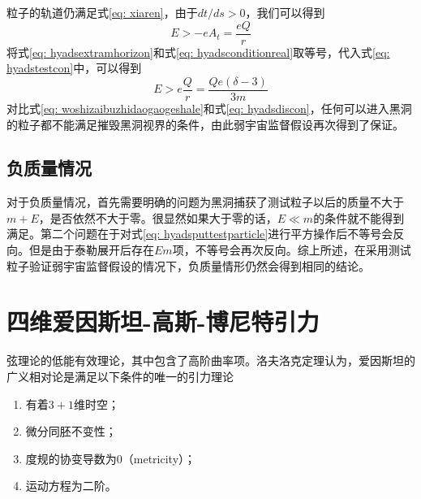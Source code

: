 粒子的轨道仍满足式\eqref{eq: xiaren}，由于$dt/ds>0$，我们可以得到
\begin{equation}\label{eq: hyadstestcon}
    E>-eA_t=\frac{eQ}{r}
\end{equation}
将式\eqref{eq: hyadsextramhorizon}和式\eqref{eq: hyadsconditionreal}取等号，代入式\eqref{eq: hyadstestcon}中，可以得到
\begin{equation}\label{eq: woshizaibuzhidaogaogeshale}
    E > e\frac{Q}{r}=\frac{Q e \left(\delta-3\right)}{3 m} 
\end{equation}
对比式\eqref{eq: woshizaibuzhidaogaogeshale}和式\eqref{eq: hyadsdiscon}，任何可以进入黑洞的粒子都不能满足摧毁黑洞视界的条件，由此弱宇宙监督假设再次得到了保证。
\subsection{负质量情况}
对于负质量情况，首先需要明确的问题为黑洞捕获了测试粒子以后的质量不大于$m+E$，是否依然不大于零。很显然如果大于零的话，$E \ll m$的条件就不能得到满足。第二个问题在于对式\eqref{eq: hyadsputtestparticle}进行平方操作后不等号会反向。但是由于泰勒展开后存在$E m $项，不等号会再次反向。综上所述，在采用测试粒子验证弱宇宙监督假设的情况下，负质量情形仍然会得到相同的结论。

\section{四维爱因斯坦-高斯-博尼特引力}
弦理论的低能有效理论，其中包含了高阶曲率项。洛夫洛克定理认为，爱因斯坦的广义相对论是满足以下条件的唯一的引力理论\citep{lanczos1938remarkable,lovelock1971einstein,lovelock1972four}
\begin{enumerate}
    \item 有着$3+1$维时空；
    \item 微分同胚不变性；
    \item 度规的协变导数为0（metricity）；
    \item 运动方程为二阶。
\end{enumerate}

